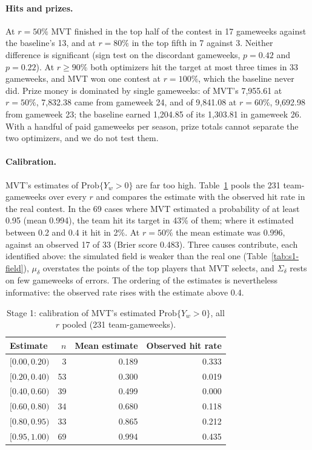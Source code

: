 \paragraph{Hits and prizes.} At $r=50\%$ MVT finished in the top half of the contest in 17
gameweeks against the baseline's 13, and at $r=80\%$ in the top fifth in 7 against 3. Neither
difference is significant (sign test on the discordant gameweeks, $p=0.42$ and $p=0.22$). At
$r\ge 90\%$ both optimizers hit the target at most three times in 33 gameweeks, and MVT won one
contest at $r=100\%$, which the baseline never did. Prize money is dominated by single
gameweeks: of MVT's 7{,}955.61 at $r=50\%$, 7{,}832.38 came from gameweek 24, and of 9{,}841.08 at
$r=60\%$, 9{,}692.98 from gameweek 23; the baseline earned 1{,}204.85 of its 1{,}303.81 in
gameweek 26. With a handful of paid gameweeks per season, prize totals cannot separate the two
optimizers, and we do not test them.

\paragraph{Calibration.} MVT's estimates of $\mathrm{Prob}\{Y_w>0\}$ are far too high.
Table~\ref{tab:s1-calibration} pools the 231 team-gameweeks over every $r$ and compares the
estimate with the observed hit rate in the real contest. In the 69 cases where MVT estimated a
probability of at least 0.95 (mean 0.994), the team hit its target in 43\% of them; where it
estimated between 0.2 and 0.4 it hit in 2\%. At $r=50\%$ the mean estimate was 0.996, against an
observed 17 of 33 (Brier score 0.483). Three causes contribute, each identified above: the
simulated field is weaker than the real one (Table~\ref{tab:s1-field}), $\mu_\delta$ overstates
the points of the top players that MVT selects, and $\Sigma_\delta$ rests on few gameweeks of
errors. The ordering of the estimates is nevertheless informative: the observed rate rises
with the estimate above 0.4.

\begin{table}[ht]
  \centering
  \caption{Stage 1: calibration of MVT's estimated $\mathrm{Prob}\{Y_w>0\}$, all $r$ pooled
  (231 team-gameweeks).}
  \label{tab:s1-calibration}
  \begin{tabular}{lrrr}
    \toprule
    Estimate & $n$ & Mean estimate & Observed hit rate \\
    \midrule
    $[0.00, 0.20)$ & 3  & 0.189 & 0.333 \\
    $[0.20, 0.40)$ & 53 & 0.300 & 0.019 \\
    $[0.40, 0.60)$ & 39 & 0.499 & 0.000 \\
    $[0.60, 0.80)$ & 34 & 0.680 & 0.118 \\
    $[0.80, 0.95)$ & 33 & 0.865 & 0.212 \\
    $[0.95, 1.00)$ & 69 & 0.994 & 0.435 \\
    \bottomrule
  \end{tabular}
\end{table}

